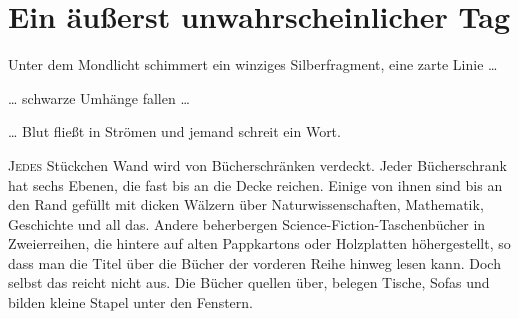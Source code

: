 \chapter[Ein äußerst unwahrscheinlicher Tag]{Ein äußerst unwahrscheinlicher Tag}

\begin{chapterOpeningQuote}
\noindent
Unter dem Mondlicht schimmert ein winziges Silberfragment, eine zarte Linie …

\vspace*{2ex}
… schwarze Umhänge fallen …

\vspace*{2ex}
… Blut fließt in Strömen und jemand schreit ein Wort.
\end{chapterOpeningQuote}

\lettrine{J}{edes} Stückchen Wand wird von Bücherschränken verdeckt. Jeder Bücherschrank hat sechs Ebenen, die fast bis an die Decke reichen. Einige von ihnen sind bis an den Rand gefüllt mit dicken Wälzern über Naturwissenschaften, Mathematik, Geschichte und all das. Andere beherbergen Science-Fiction-Taschenbücher in Zweierreihen, die hintere auf alten Pappkartons oder Holzplatten höhergestellt, so dass man die Titel über die Bücher der vorderen Reihe hinweg lesen kann. Doch selbst das reicht nicht aus. Die Bücher quellen über, belegen Tische, Sofas und bilden kleine Stapel unter den Fenstern.


